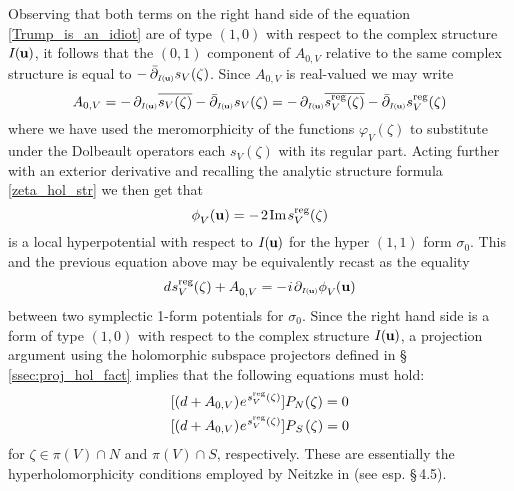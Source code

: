 \documentclass[11pt]{amsart}
\theoremstyle{remark}
\theoremstyle{remark}
\theoremstyle{definition}
\theoremstyle{definition}
\theoremstyle{definition}
\newcommand{\IU}{I\nhp(\nhp\mathbf{u}\hspace{-0.2pt})} %
\newcommand{\Iu}{\scriptscriptstyle{I\nhp(\nhp\mathbf{u}\hspace{-0.25pt})}} %
\newcommand{\0}{{\scriptstyle 0'}} %
\newcommand{\1}{{\scriptstyle 1'}}
\newcommand{\pt}{\hspace{1pt}} %
\newcommand{\hp}{\hspace{0.5pt}} %
\newcommand{\nhp}{\hspace{-0.5pt}} %
\renewcommand{\Im }{\hp\mbox{Im}\hp}
\begin{document}
Observing that both terms on the right hand side of the equation \eqref{Trump_is_an_idiot} are of type $(1,0)$ with respect to the complex structure $\IU$, it follows that the $(0,1)$ component of $A_{0,V}$ relative to the same complex structure is equal to $- \, \bar{\partial}_{\Iu} s_V(\zeta)$. Since $A_{0,V}$ is real-valued we may write 
\begin{equation}
A_{0,V} = - \, \partial_{\Iu} \overline{s_V(\zeta)} - \bar{\partial}_{\Iu} s_V(\zeta) 
= -\, \partial_{\Iu} \overline{s^{\text{reg}}_V(\zeta)} - \bar{\partial}_{\Iu} s^{\text{reg}}_V(\zeta) 
\end{equation}
where we have used the meromorphicity of the functions $\varphi_V(\zeta)$ to substitute under the Dolbeault operators each $s_V(\zeta)$ with its regular part. Acting further with an exterior derivative and recalling the analytic structure formula \eqref{zeta_hol_str} we then get that 
\begin{equation}
\phi^{\phantom{g}}_V(\mathbf{u}) = -\pt 2 \hp \Im \hp s^{\text{reg}}_V(\zeta) 
\end{equation}
is a local hyperpotential with respect to $\IU$ for the hyper $(1,1)$ form $\sigma_0$. This and the previous equation above may be equivalently recast as  the equality
\begin{equation}
d\hp s^{\text{reg}}_V(\zeta) + A^{\phantom{g}}_{0,V} = - \hp i \pt \partial_{\Iu} \phi^{\phantom{g}}_V\nhp(\mathbf{u}) 
\end{equation}
between two symplectic 1-form potentials for $\sigma_0$. Since the right hand side is a form of type $(1,0)$ with respect to the complex structure $\IU$, a projection argument using the holomorphic subspace projectors defined in \mbox{\S\,\ref{ssec:proj_hol_fact}} implies that the following equations must hold:
\begin{equation}
\begin{aligned}
& [(d+ A_{0,V}) \hp e^{\hp s^{\text{reg}}_V(\zeta)}] P_N(\zeta) = 0 \\
& [(d+ A_{0,V}) \hp e^{\hp s^{\text{reg}}_V(\zeta)}] P_{\pt S\pt}(\zeta) = 0
\end{aligned}
\end{equation}
for $\zeta \in \pi(V) \cap N$ and $\pi(V) \cap S$, respectively. 
These are essentially the hyperholomorphicity conditions employed by Neitzke in \cite{Neitzke:2011za} (see esp. \mbox{\S\,4.5}). 
\end{document}
